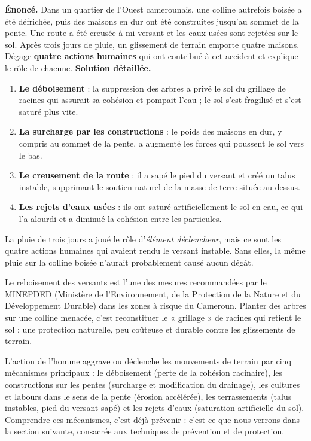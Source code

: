 \documentclass[11pt]{article}
\newcommand{\cle}[1]{{\popxbold\color{popdark}#1}}
\begin{document}
\begin{exoresolu}
\textbf{Énoncé.} Dans un quartier de l'Ouest camerounais, une colline autrefois boisée a été défrichée, puis des maisons en dur ont été construites jusqu'au sommet de la pente. Une route a été creusée à mi-versant et les eaux usées sont rejetées sur le sol. Après trois jours de pluie, un glissement de terrain emporte quatre maisons. Dégage \textbf{quatre actions humaines} qui ont contribué à cet accident et explique le rôle de chacune.
\tcblower
\textbf{Solution détaillée.}
\begin{enumerate}
\item \textbf{Le déboisement} : la suppression des arbres a privé le sol du grillage de racines qui assurait sa cohésion et pompait l'eau ; le sol s'est fragilisé et s'est saturé plus vite.
\item \textbf{La surcharge par les constructions} : le poids des maisons en dur, y compris au sommet de la pente, a augmenté les forces qui poussent le sol vers le bas.
\item \textbf{Le creusement de la route} : il a sapé le pied du versant et créé un talus instable, supprimant le soutien naturel de la masse de terre située au-dessus.
\item \textbf{Les rejets d'eaux usées} : ils ont saturé artificiellement le sol en eau, ce qui l'a alourdi et a diminué la cohésion entre les particules.
\end{enumerate}
La pluie de trois jours a joué le rôle d'\emph{élément déclencheur}, mais ce sont les quatre actions humaines qui avaient rendu le versant instable. Sans elles, la même pluie sur la colline boisée n'aurait probablement causé aucun dégât.
\end{exoresolu}

\begin{savaistu}
Le reboisement des versants est l'une des mesures recommandées par le MINEPDED (Ministère de l'Environnement, de la Protection de la Nature et du Développement Durable) dans les zones à risque du Cameroun. Planter des arbres sur une colline menacée, c'est reconstituer le « grillage » de racines qui retient le sol : une protection naturelle, peu coûteuse et durable contre les glissements de terrain.
\end{savaistu}

\begin{aretenir}
L'action de l'homme aggrave ou déclenche les mouvements de terrain par cinq mécanismes principaux : le \cle{déboisement} (perte de la cohésion racinaire), les \cle{constructions sur les pentes} (surcharge et modification du drainage), les \cle{cultures et labours dans le sens de la pente} (érosion accélérée), les \cle{terrassements} (talus instables, pied du versant sapé) et les \cle{rejets d'eaux} (saturation artificielle du sol). Comprendre ces mécanismes, c'est déjà prévenir : c'est ce que nous verrons dans la section suivante, consacrée aux techniques de prévention et de protection.
\end{aretenir}
\end{document}

